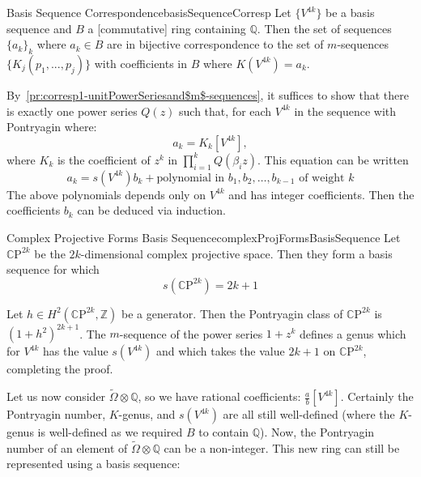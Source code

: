 \documentclass{ut-thesis}
\newenvironment{Proof}[1][]
  {\begin{ProofTcb}[#1]}
  {\end{ProofTcb}}
\newcommand{\Q}{{\mathbb{Q}}}
\newcommand{\CP}{{\mathbb{C}\mathrm{P}}}
\begin{document}
\begin{thm}{Basis Sequence Correspondence}{basisSequenceCorresp}
  Let $\{V^{4k}\}$ be a basis sequence and $B$ a [commutative] ring containing $\Q$. Then the set of sequences
  $\{a_k\}_k$ where $a_k \in B$ are in bijective correspondence to the set of $m$-sequences $\{K_j(p_1, ...,
  p_j)\}$ with coefficients in $B$ where $K(V^{4k}) = a_k$.
\end{thm}

\begin{Proof}
  By~\cref{pr:corresp1-unitPowerSeriesand$m$-sequences}, it suffices to show that there is exactly one power
  series $Q(z)$ such that, for each $V^{4k}$ in the sequence with Pontryagin where:
    \[
    a_k = K_k[V^{4k}],
    \]
    where $K_k$ is the coefficient of $z^k$ in $\prod_{i=1}^k Q(\beta_i z)$. This equation can be written
    \[
    a_k = s(V^{4k})b_k + \text{polynomial in } b_1, b_2, \ldots, b_{k-1} \text{ of weight } k
    \]
    The above polynomials depends only on $V^{4k}$ and has integer coefficients. Then the coefficients $b_k$
    can be deduced via induction.
  \end{Proof}


\begin{thm}{Complex Projective Forms Basis Sequence}{complexProjFormsBasisSequence}
  Let $\CP^{2k}$ be the $2k$-dimensional complex projective space. Then they form a basis sequence for which
  \[
    s(\CP^{2k}) = 2k+1
  \]
\end{thm}

\begin{Proof}
  Let $h \in H^2(\CP^{2k}, \mathbb{Z})$ be a generator. Then the Pontryagin class of
  $\CP^{2k}$ is $(1 + h^2)^{2k+1}$. The $m$-sequence of the power series $1 + z^k$ defines a genus which for
  $V^{4k}$ has the value $s(V^{4k})$ and which takes the value $2k + 1$ on $\CP^{2k}$, completing the proof.
\end{Proof}

Let us now consider $\widetilde{\Omega}\otimes \Q$, so we have rational coefficients: $\frac{a}{b}[V^{4k}]$.
Certainly the Pontryagin number, $K$-genus, and $s(V^{4k})$ are all still well-defined (where the $K$-genus is
well-defined as we required $B$ to contain $\Q$). Now, the Pontryagin number of an element of
$\widetilde{\Omega}\otimes \Q$ can be a non-integer. This new ring can still be represented using a basis
sequence:
\end{document}
